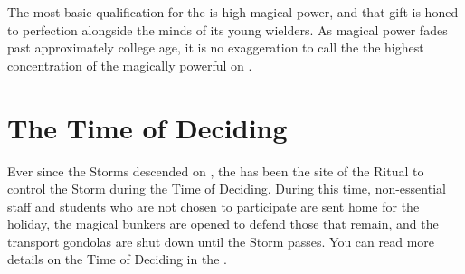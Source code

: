 \documentclass[blue]{GL2020}
\begin{document}
The most basic qualification for the \pSc{} is high magical power, and that gift is honed to perfection alongside the minds of its young wielders. As magical power fades past approximately college age, it is no exaggeration to call the \pSchool{} the highest concentration of the magically powerful on \pEarth{}.

\section*{The Time of Deciding}

Ever since the Storms descended on \pEarth{}, the \pSc{} has been the site of the Ritual to control the Storm during the Time of Deciding. During this time, non-essential staff and students who are not chosen to participate are sent home for the holiday, the magical bunkers are opened to defend those that remain, and the transport gondolas are shut down until the Storm passes. You can read more details on the Time of Deciding in the \bWorld{}.
\end{document}
